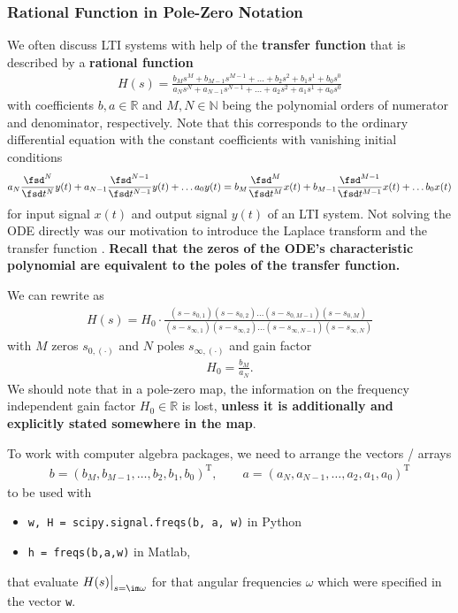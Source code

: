 \subsubsection{Rational Function in Pole-Zero Notation}
We often discuss LTI systems with help of the \textbf{transfer function} that
is described by a \textbf{rational function}
\begin{align}
\label{eq:Hs_b_a}
H(s) = \frac
{b_M s^M + b_{M-1} s^{M-1} + \dots + b_2 s^2 + b_1 s^1 + b_0 s^0}
{a_N s^N + a_{N-1} s^{N-1} + \dots + a_2 s^2 + a_1 s^1 + a_0 s^0}
\end{align}
with coefficients $b,a \in \mathbb{R}$ and $M,N \in \mathbb{N}$ being the
polynomial orders of numerator and denominator, respectively.
%
Note that this corresponds to the ordinary differential equation with the
constant coefficients with vanishing initial conditions
\begin{align}
a_N \frac{\fsd^N}{\fsd t^N}y(t) + a_{N-1} \frac{\fsd^{N-1}}{\fsd t^{N-1}}y(t) + \dots a_0 y(t)=
b_M \frac{\fsd^M}{\fsd t^M}x(t) + b_{M-1} \frac{\fsd^{M-1}}{\fsd t^{M-1}}x(t) + \dots b_0 x(t)
\end{align}
for input signal $x(t)$ and output signal $y(t)$ of an LTI system.
%
Not solving the ODE directly was our motivation to introduce the Laplace transform
and the transfer function .
\textbf{Recall that the zeros of the ODE's characteristic polynomial are equivalent to
the poles of the transfer function.}
%

We can rewrite  as
\begin{align}
\label{eq:Hs_H0_z_p}
H(s) = H_0 \cdot \frac
{(s-s_{0,1}) (s-s_{0,2}) \dots (s-s_{0,M-1}) (s-s_{0,M})}
{(s-s_{\infty,1}) (s-s_{\infty,2}) \dots (s-s_{\infty,N-1}) (s-s_{\infty,N})}
\end{align}
with $M$ zeros $s_{0,(\cdot)}$ and $N$ poles $s_{\infty,(\cdot)}$
and gain factor
\begin{align}
H_0 = \frac{b_M}{a_N}.
\end{align}
%
We should note that in a pole-zero map, the information on the frequency
independent gain factor $H_0 \in \mathbb{R}$ is lost, \textbf{unless it is
additionally and explicitly stated somewhere in the map}.

To work with computer algebra packages, we need to arrange the vectors / arrays
\begin{align}
b = (b_M, b_{M-1}, \dots, b_2, b_1, b_0)^\mathrm{T}, \qquad
a = (a_N, a_{N-1}, \dots, a_2, a_1, a_0)^\mathrm{T}
\end{align}
to be used with
\begin{itemize}
  \item \verb|w, H = scipy.signal.freqs(b, a, w)| in Python
  \item \verb|h = freqs(b,a,w)| in Matlab,
\end{itemize}
that evaluate $H(s)\big|_{s=\im\omega}$ for that
angular frequencies $\omega$ which were specified in the vector \verb|w|.



